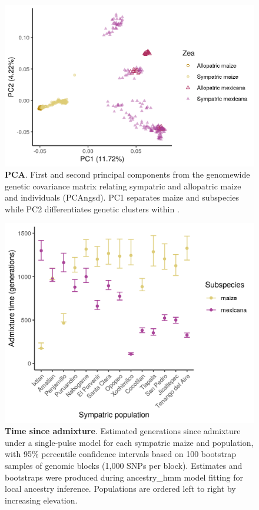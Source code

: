 \begin{figure}[ht]
\includegraphics[width=\textwidth]{chapter2/figures/HILO_MAIZE55_pca.png}
\caption{\color{Gray} \textbf{PCA}. First and second principal components from the genomewide genetic covariance matrix relating sympatric and allopatric  maize and \mexicana individuals (PCAngsd). PC1 separates maize and \mexicana subspecies while PC2 differentiates genetic clusters within \mexicana.}
\label{pca_maize_mex}
\end{figure}

\begin{figure}[ht]
\includegraphics[width=\textwidth]{chapter2/figures/admix_times_Ne10000_yesBoot.png}
\caption{\color{Gray} \textbf{Time since admixture}. Estimated generations since admixture under a single-pulse model for each sympatric maize and \mexicana population, with 95\% percentile confidence intervals based on 100 bootstrap samples of genomic blocks (1,000 SNPs per block). Estimates and bootstraps were produced during ancestry\_hmm model fitting for local ancestry inference. Populations are ordered left to right by increasing elevation.}
\label{time_admix}
\end{figure}


